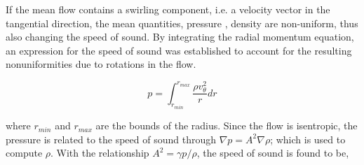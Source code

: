 



If the mean flow contains a swirling component, i.e. a velocity vector in the 
tangential direction, the mean quantities, pressure , density are non-uniform, 
thus also changing the speed of sound. By integrating the radial momentum
equation, an expression for the speed of sound was established to account for 
the resulting nonuniformities due to rotations in the flow. 




\begin{equation}
    p = \int_{r_{min}}^{r_{max}} \frac{\rho v_{\theta}^2}{r} dr 
    \label{eqn:radialmomentum_integrated}
\end{equation}

where $r_{min}$ and $r_{max}$ are the bounds of the radius. Since the flow
is isentropic, the pressure is related to the speed of sound through $\nabla p =
A^2 \nabla \rho$; which is used to compute $\rho$. With the relationship 
$A^2 = \gamma p/\rho$, the speed of sound is found to be,




